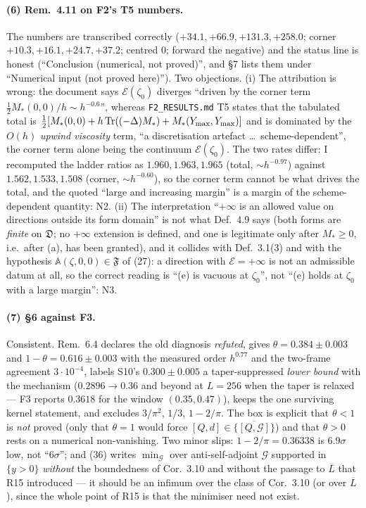 \documentclass[11pt]{article}
\newcommand{\Aop}{\mathbb A}
\begin{document}
\paragraph{(6) Rem.~4.11 on F2's T5 numbers.}  The numbers are transcribed correctly
($+34.1,+66.9,+131.3,+258.0$; corner $+10.3,+16.1,+24.7,+37.2$; centred $0$; forward the
negative) and the status line is honest (``Conclusion (numerical, not proved)'', and \S7
lists them under ``Numerical input (not proved here)'').  Two objections.  (i) The
attribution is wrong: the document says $\mathcal E(\zeta_0)$ diverges ``driven by the
corner term $\frac12M_*(0,0)/h\sim h^{-0.6}$'', whereas \texttt{F2\_RESULTS.md} T5 states
that the tabulated total is $\frac12[M_*(0,0)+h\operatorname{Tr}((-\Delta)M_*)+M_*(Y_{\max},Y_{\max})]$
and is dominated by the $O(h)$ \emph{upwind viscosity} term, ``a discretisation artefact
\dots\ scheme-dependent'', the corner term alone being the continuum $\mathcal E(\zeta_0)$.
The two rates differ: I recomputed the ladder ratios as $1.960,1.963,1.965$ (total,
$\sim h^{-0.97}$) against $1.562,1.533,1.508$ (corner, $\sim h^{-0.60}$), so the corner term
cannot be what drives the total, and the quoted ``large and increasing margin'' is a margin
of the scheme-dependent quantity: N2.  (ii) The interpretation ``$+\infty$ is an allowed
value on directions outside its form domain'' is not what Def.~4.9 says (both forms are
\emph{finite} on $\mathfrak D$; no $+\infty$ extension is defined, and one is legitimate
only after $M_*\ge0$, i.e.\ after (a), has been granted), and it collides with Def.~3.1(3)
and with the hypothesis $\Aop(\zeta,0,0)\in\mathfrak F$ of (27): a direction with
$\mathcal E=+\infty$ is not an admissible datum at all, so the correct reading is ``(e) is
vacuous at $\zeta_0$'', not ``(e) holds at $\zeta_0$ with a large margin'': N3.

\paragraph{(7) \S6 against F3.}  Consistent.  Rem.~6.4 declares the old diagnosis
\emph{refuted}, gives $\theta=0.384\pm0.003$ and $1-\theta=0.616\pm0.003$ with the measured
order $h^{0.77}$ and the two-frame agreement $3\cdot10^{-4}$, labels S10's $0.300\pm0.005$ a
taper-suppressed \emph{lower bound} with the mechanism ($0.2896\to0.36$ and beyond at
$L=256$ when the taper is relaxed --- F3 reports $0.3618$ for the window $(0.35,0.47)$),
keeps the one surviving kernel statement, and excludes $3/\pi^2$, $1/3$, $1-2/\pi$.  The
box is explicit that $\theta<1$ is \emph{not} proved (only that $\theta=1$ would force
$[Q,d]\in\overline{\{[Q,\mathcal G]\}}$) and that $\theta>0$ rests on a numerical
non-vanishing.  Two minor slips: $1-2/\pi=0.36338$ is $6.9\sigma$ low, not ``$6\sigma$'';
and (36) writes $\min_{\mathcal G}$ over anti-self-adjoint $\mathcal G$
supported in $\{y>0\}$ \emph{without} the boundedness of Cor.~3.10 and without the passage
to $\overline L$ that R15 introduced --- it should be an infimum over the class of
Cor.~3.10 (or over $\overline L$), since the whole point of R15 is that the minimiser need
not exist.
\end{document}

